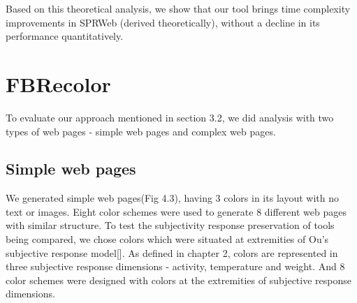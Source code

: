 Based on this theoretical analysis, we show that our tool brings time complexity improvements in SPRWeb (derived theoretically), without a decline in its performance quantitatively.  


\section{FBRecolor}
\label{FBRecolor}

To evaluate our approach mentioned in section 3.2, we did analysis with two types of web pages - simple web pages and complex web pages. 

\subsection{Simple web pages}
\label{Simple web pages}

We generated simple web pages(Fig 4.3), having 3 colors in its layout with no text or images. Eight color schemes were used to generate 8 different web pages with similar structure. To test the subjectivity response preservation of tools being compared, we chose colors which were situated at extremities of Ou's subjective response model[]. As defined in chapter 2, colors are represented in three subjective response dimensions - activity, temperature and weight. And 8 color schemes were designed with colors at the extremities of subjective response dimensions. 

